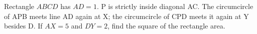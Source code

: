 Rectangle $ABCD$ has $AD=1$. P is strictly inside diagonal AC. The circumcircle of APB meets line AD again at X; the circumcircle of CPD meets it again at Y besides D. If $AX=5$ and $DY=2$, find the square of the rectangle area.
